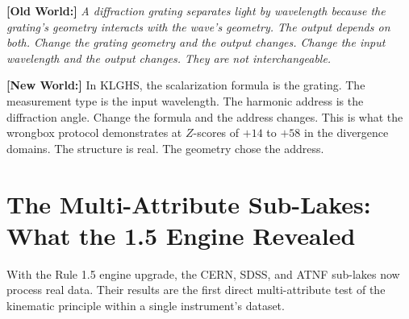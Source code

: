 \documentclass[11pt, letterpaper, openany]{book}
\newcommand{\oldworld}[1]{\noindent\textbf{\color{goldseal}[Old World:]} \textit{#1}\medskip}
\newcommand{\newworld}[1]{\noindent\textbf{\color{kishblue}[New World:]} #1\medskip}
\begin{document}
\oldworld{A diffraction grating separates light by wavelength because the
grating's geometry interacts with the wave's geometry. The output depends on
both. Change the grating geometry and the output changes. Change the input
wavelength and the output changes. They are not interchangeable.}

\newworld{In KLGHS, the scalarization formula is the grating. The measurement
type is the input wavelength. The harmonic address is the diffraction angle.
Change the formula and the address changes. This is what the wrongbox protocol
demonstrates at $Z$-scores of $+14$ to $+58$ in the divergence domains. The
structure is real. The geometry chose the address.}

\section{The Multi-Attribute Sub-Lakes: What the 1.5 Engine Revealed}

With the Rule 1.5 engine upgrade, the CERN, SDSS, and ATNF sub-lakes now
process real data. Their results are the first direct multi-attribute test
of the kinematic principle within a single instrument's dataset.
\end{document}
